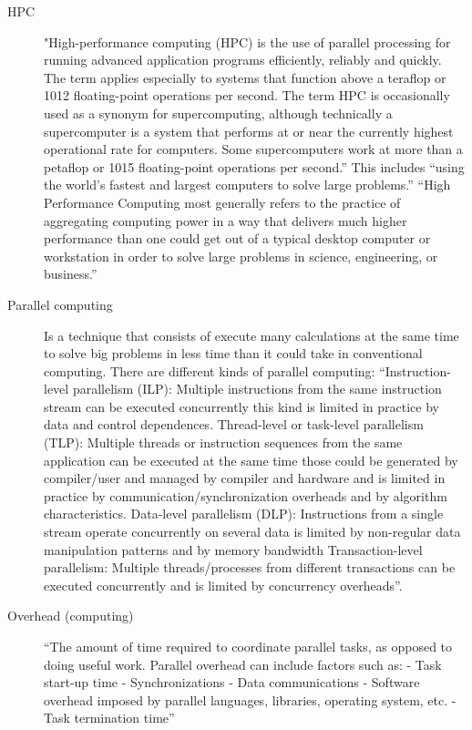 \documentclass[fleqn,10pt]{SelfArx} %
\begin{document}
\begin{description}
	\item[HPC] 
	"High-performance computing (HPC) is the use of parallel processing for running advanced application programs efficiently, reliably and quickly. The term applies especially to systems that function above a teraflop or 1012 floating-point operations per second. The term HPC is occasionally used as a synonym for supercomputing, although technically a supercomputer is a system that performs at or near the currently highest operational rate for computers. Some supercomputers work at more than a petaflop or 1015 floating-point operations per second.” \cite{hpc_def} This includes “using the world's fastest and largest computers to solve large problems.” \cite{parallel_comp_lawrence_nat_lab}
	“High Performance Computing most generally refers to the practice of aggregating computing power in a way that delivers much higher performance than one could get out of a typical desktop computer or workstation in order to solve large problems in science, engineering, or business.” \cite{hpc}
	
	\item[Parallel computing] 
	Is a technique that consists of execute many calculations at the same time to solve big problems in less time than it could take in conventional computing. There are different kinds of parallel computing:
	“Instruction-level parallelism (ILP): Multiple instructions from the same instruction stream can be executed concurrently this kind is limited in practice by data and control dependences.
	Thread-level or task-level parallelism (TLP): Multiple threads or instruction sequences from the same application can be executed at the same time those could be generated by compiler/user and managed by compiler and hardware and is limited in practice by communication/synchronization overheads and by algorithm characteristics.
	Data-level parallelism (DLP): Instructions from a single stream operate concurrently on several data is limited by non-regular data manipulation patterns and by memory bandwidth 
	Transaction-level parallelism: Multiple threads/processes from different transactions can be executed concurrently and is limited by concurrency overheads”\cite{Parallel Computing}.
	
	\item[Overhead (computing)] “The amount of time required to coordinate parallel tasks, as opposed to doing useful work. Parallel overhead can include factors such as:
	- Task start-up time
	- Synchronizations
	- Data communications
	- Software overhead imposed by parallel languages, libraries, operating system, etc.
	- Task termination time”  \cite{parallel_comp_lawrence_nat_lab}
	

\end{description}
\end{document}
